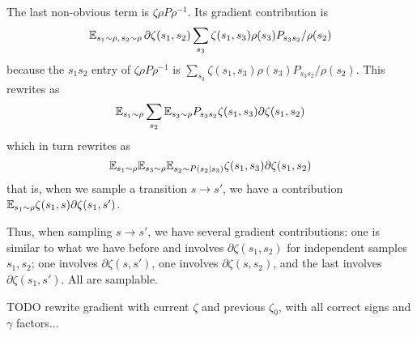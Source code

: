 \documentclass[11pt,a4paper]{article}
\newcommand{\ztar}{z^\mathrm{tar}}
\begin{document}
The last non-obvious term is $\zeta\rho P \rho^{-1}$. Its gradient
contribution is
\begin{equation}
\mathbb{E}_{s_1\sim \rho,\,s_2\sim \rho} \,\partial \zeta(s_1,s_2)\sum_{s_3}
\zeta(s_1,s_3)\rho(s_3)P_{s_3s_2}/\rho(s_2)
\end{equation}
because the $s_1s_2$ entry of $\zeta\rho P \rho^{-1}$ is $\sum_{s_3}
\zeta(s_1,s_3)\rho(s_3)P_{s_3s_2}/\rho(s_2)$. This rewrites as
\begin{equation}
\mathbb{E}_{s_1\sim \rho}\sum_{s_2} \mathbb{E}_{s_3\sim\rho} P_{s_3s_2}
\zeta(s_1,s_3)\partial\zeta(s_1,s_2)
\end{equation}
which in turn rewrites as
\begin{equation}
\mathbb{E}_{s_1\sim \rho}\mathbb{E}_{s_3\sim\rho} \mathbb{E}_{s_2\sim P(s_2|s_3)}
\zeta(s_1,s_3)\partial\zeta(s_1,s_2)
\end{equation}
that is, when we sample a transition $s\to s'$, we have a contribution
$\mathbb{E}_{s_1\sim \rho}\zeta(s_1,s)\partial \zeta(s_1,s')$.

Thus, when sampling $s\to s'$, we have several gradient contributions:
one is similar to what we have before and involves
$\partial\zeta(s_1,s_2)$ for independent samples $s_1,s_2$; one involves
$\partial\zeta(s,s')$, one involves $\partial\zeta(s,s_2)$, and the last
involves $\partial\zeta(s_1,s')$. All are samplable.

TODO rewrite gradient with current $\zeta$ and previous $\zeta_0$, with
all correct signs and $\gamma$ factors...

\end{document}

